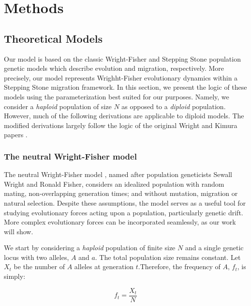 \chapter{Methods}

\section{Theoretical Models}

Our model is based on the classic Wright-Fisher \cite{wright_evolution_1931}\cite{fisher_mathematical_1922} and Stepping Stone \cite{kimura_stepping_1964} population genetic models which describe evolution and migration, respectively. More precisely, our model represents Wrighht-Fisher evolutionary dynamics within a Stepping Stone migration framework. In this section, we present the logic of these models using the parameterization best suited for our purposes. Namely, we consider a \textit{haploid} population of size $N$ as opposed to a \textit{diploid} population. However, much of the following derivations are applicable to diploid models. The modified derivations largely follow the logic of the original Wright \cite{wright_evolution_1931} and Kimura \cite{kimura_stepping_1964} papers \cite{Rackauckas2014AnII}\cite{tran_introduction_2013} \cite{durrett_probability_2008}.


\subsection{The neutral Wright-Fisher model} \label{section:neutral_wf}

The neutral Wright-Fisher model \cite{wright_evolution_1931}\cite{fisher_mathematical_1922}, named after population geneticists Sewall Wright and Ronald Fisher, considers an idealized population with random mating, non-overlapping generation times; and without mutation, migration or natural selection. Despite these assumptions, the model serves as a useful tool for studying evolutionary forces acting upon a population, particularly genetic drift. More complex evolutionary forces can be incorporated seamlessly, as our work will show. 


We start by considering a \textit{haploid} population of finite size $N$ and a single genetic locus with two alleles, $A$ and $a$. The total population size remains constant. Let $X_t$ be the number of $A$ alleles at generation $t$.Therefore, the frequency of $A$, $f_t$, is simply:

\begin{equation}
    f_t = \frac{X_t}{N}
\end{equation}

